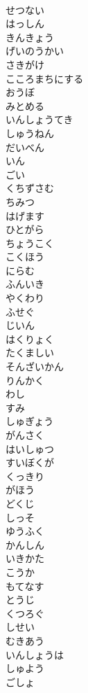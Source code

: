 \documentclass[8pt]{extreport}
\begin{document}
\begin{CJK}{UTF8}{min}
\\	せつない
\\	はっしん
\\	きんきょう
\\	げいのうかい
\\	さきがけ
\\	こころまちにする
\\	おうぼ
\\	みとめる
\\	いんしょうてき
\\	しゅうねん
\\	だいべん
\\	いん
\\	ごい
\\	くちずさむ
\\	ちみつ
\\	はげます
\\	ひとがら
\\	ちょうこく
\\	こくほう
\\	にらむ
\\	ふんいき
\\	やくわり
\\	ふせぐ
\\	じいん
\\	はくりょく
\\	たくましい
\\	そんざいかん
\\	りんかく
\\	わし
\\	すみ
\\	しゅぎょう
\\	がんさく
\\	はいしゅつ
\\	すいぼくが
\\	くっきり
\\	がほう
\\	どくじ
\\	しっそ
\\	ゆうふく
\\	かんしん
\\	いきかた
\\	こうか
\\	もてなす
\\	とうじ
\\	くつろぐ
\\	しせい
\\	むきあう
\\	いんしょうは
\\	しゅよう
\\	ごしょ

\end{CJK}
\end{document}
